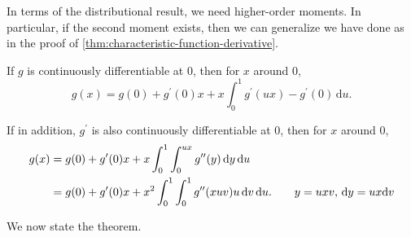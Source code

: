 In terms of the distributional result, we need higher-order moments. In particular, if the second moment exists, then we can generalize we have done as in the proof of \autoref{thm:characteristic-function-derivative}.

\begin{prev}
	If \(g\) is continuously differentiable at \(0\), then for \(x\) around \(0\),
	\[
		g(x)
		= g(0) + g^{\prime} (0) x + x \int_{0}^{1} g^{\prime} (ux) - g^{\prime} (0) \,\mathrm{d}u .
	\]
\end{prev}

\begin{note}\label{note:lec10}
	If in addition, \(g^{\prime} \) is also continuously differentiable at \(0\), then for \(x\) around \(0\),
	\begin{align*}
		g(x)
		 & = g(0) + g^{\prime} (0) x + x \int_{0}^{1} \int_{0}^{ux} g^{\prime\prime} (y) \,\mathrm{d}y \,\mathrm{d} u                                                               \\
		 & = g(0) + g^{\prime} (0) x + x^2 \int_{0}^{1} \int_{0}^{1} g^{\prime\prime} (xuv) u \,\mathrm{d}v \,\mathrm{d} u. \tag*{\(y = ux v\), \(\mathrm{d} y = ux \mathrm{d} v\)} \\
	\end{align*}
\end{note}

We now state the theorem.

